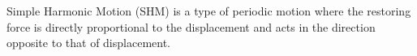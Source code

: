 \documentclass[preview]{standalone}
\begin{document}
\begin{flushleft}
Simple Harmonic Motion (SHM) is a type of periodic motion where the restoring force is directly proportional to the displacement and acts in the direction opposite to that of displacement.
\end{flushleft}
\end{document}
